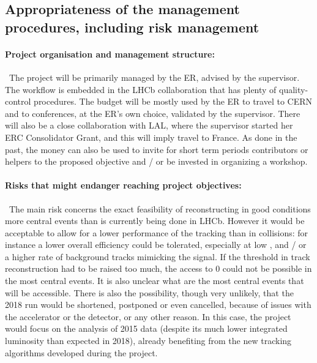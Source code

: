 \documentclass[a4paper,11pt]{article}
\newcommand{\ER}{ER\xspace}
\newcommand{\supervisor}{the supervisor\xspace}
\begin{document}
%            

\subsection{Appropriateness of the management procedures, including risk management }


\paragraph{Project organisation and management structure: }\
The project will be primarily managed by the \ER, advised by \supervisor. The workflow is embedded in the LHCb
collaboration that has plenty of quality-control procedures. The budget will be mostly used by the \ER to travel to
CERN and to conferences, at the \ER’s own choice, validated by \supervisor. There will also be a close collaboration with LAL, where \supervisor started her ERC Consolidator Grant, and this will imply travel to France. As done in the past,
the money can also be used to invite for short term periods contributors or helpers to the proposed objective and / or
be invested in organizing a workshop.



\paragraph{Risks that might endanger reaching project objectives: }\
The main risk concerns the exact feasibility of reconstructing in good conditions more central events than is currently being done in LHCb. However it would be acceptable to allow for a lower performance of the tracking than in \pp collisions: for instance a lower overall efficiency could be tolerated, especially at low \pt, and / or a higher rate of background tracks mimicking the signal. If the \pt threshold in track reconstruction had to be raised too much, the access to 0 \pt \Dz could not be possible in the most central events. It is also unclear what are the most central events that will be accessible. 
%
There is also the possibility, though very unlikely, that the 2018 \pbpb run would be shortened, postponed or even cancelled, because of issues with the accelerator or the detector, or any other reason. In this case, the project would focus on the analysis of 2015 \pbpb data (despite its much lower integrated luminosity than expected in 2018), already benefiting from the new tracking algorithms developed during the project.
\end{document}
